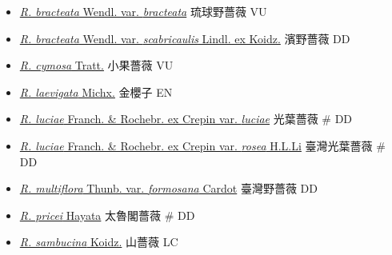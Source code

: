 \begin{itemize}
  \begin{itemize}
        \item[] \href{http://www.theplantlist.org/tpl1.1/search?q=Rosa+bracteata+var.+bracteata}{\textit{R. bracteata} Wendl. var. \textit{bracteata}}   琉球野薔薇   VU
        \item[] \href{http://www.theplantlist.org/tpl1.1/search?q=Rosa+bracteata+var.+scabricaulis}{\textit{R. bracteata} Wendl. var. \textit{scabricaulis} Lindl. ex Koidz.}   濱野薔薇   DD
        \item[] \href{http://www.theplantlist.org/tpl1.1/search?q=Rosa+cymosa}{\textit{R. cymosa} Tratt.}   小果薔薇   VU
        \item[] \href{http://www.theplantlist.org/tpl1.1/search?q=Rosa+laevigata}{\textit{R. laevigata} Michx.}   金櫻子   EN
        \item[] \href{http://www.theplantlist.org/tpl1.1/search?q=Rosa+luciae+var.+luciae}{\textit{R. luciae} Franch. \& Rochebr. ex Crepin var. \textit{luciae}}   光葉薔薇  \# DD
        \item[] \href{http://www.theplantlist.org/tpl1.1/search?q=Rosa+luciae+var.+rosea}{\textit{R. luciae} Franch. \& Rochebr. ex Crepin var. \textit{rosea} H.L.Li}   臺灣光葉薔薇  \# DD
        \item[] \href{http://www.theplantlist.org/tpl1.1/search?q=Rosa+multiflora+var.+formosana}{\textit{R. multiflora} Thunb. var. \textit{formosana} Cardot}   臺灣野薔薇   DD
        \item[] \href{http://www.theplantlist.org/tpl1.1/search?q=Rosa+pricei}{\textit{R. pricei} Hayata}   太魯閣薔薇  \# DD
        \item[] \href{http://www.theplantlist.org/tpl1.1/search?q=Rosa+sambucina}{\textit{R. sambucina} Koidz.}   山薔薇   LC

\end{itemize}
\end{itemize}
